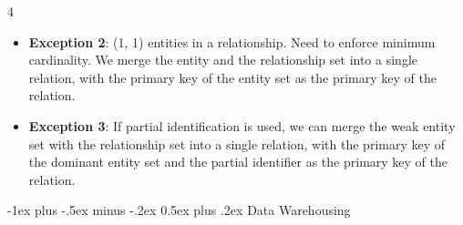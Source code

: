 \documentclass[10pt, landscape]{article}
\makeatletter
\renewcommand{\section}{\@startsection{section}{1}{0mm}%
  {-1ex plus -.5ex minus -.2ex}%
  {0.5ex plus .2ex}%
{\normalfont\large\bfseries}}
\makeatother
\begin{document}
\begin{multicols*}{4}
\begin{itemize}
\begin{itemize}
      \item \textbf{Exception 2}: (1, 1) entities in a relationship. Need to enforce minimum cardinality. We merge the entity and the relationship set into a single relation, with the primary key of the entity set as the primary key of the relation.
      \item \textbf{Exception 3}: If partial identification is used, we can merge the weak entity set with the relationship set into a single relation, with the primary key of the dominant entity set and the partial identifier as the primary key of the relation.
    \end{itemize}
  \end{itemize}

  \section{Data Warehousing}


\end{multicols*}
\end{document}
